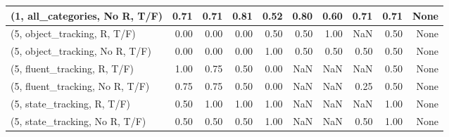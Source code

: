 \begin{table*}[h!]
\begin{adjustbox}{width=2\columnwidth,center}
\begin{tabular}{lrrr|rrr|rrr}
(1, all\_categories, No R, T/F)       &                      0.71 &                  0.71 &                      0.81 &                          0.52 &                      0.80 &                          0.60 &                                   0.71 &                               0.71 &                                  None \\



\midrule
(5, object\_tracking, R, T/F)         &                      0.00 &                  0.00 &                      0.00 &                          0.50 &                      0.50 &                          1.00 &                                    NaN &                               0.50 &                                  None \\
(5, object\_tracking, No R, T/F)      &                      0.00 &                  0.00 &                      0.00 &                          1.00 &                      0.50 &                          0.50 &                                   0.50 &                               0.50 &                                  None \\
(5, fluent\_tracking, R, T/F)         &                      1.00 &                  0.75 &                      0.50 &                          0.00 &                       NaN &                           NaN &                                    NaN &                               0.50 &                                  None \\
(5, fluent\_tracking, No R, T/F)      &                      0.75 &                  0.75 &                      0.50 &                          0.00 &                       NaN &                           NaN &                                   0.25 &                               0.50 &                                  None \\
(5, state\_tracking, R, T/F)          &                      0.50 &                  1.00 &                      1.00 &                          1.00 &                       NaN &                           NaN &                                    NaN &                               1.00 &                                  None \\
(5, state\_tracking, No R, T/F)       &                      0.50 &                  0.50 &                      0.50 &                          1.00 &                       NaN &                           NaN &                                   0.50 &                               1.00 &                                  None \\

\end{tabular}
\end{adjustbox}
\end{table*}
